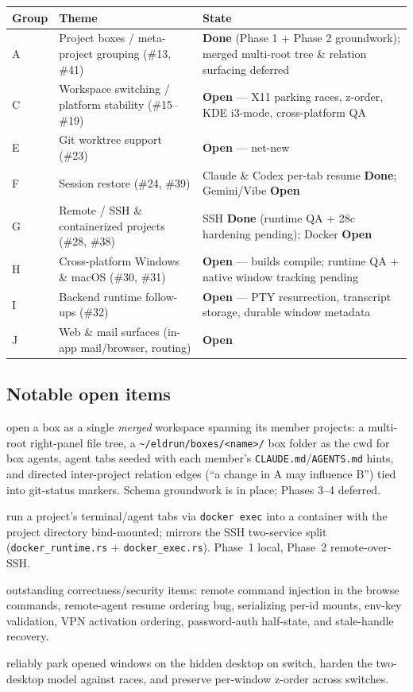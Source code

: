 \documentclass[11pt,a4paper]{article}
\newcommand{\done}{\textcolor{donegreen}{\textbf{Done}}}
\newcommand{\open}{\textcolor{openorange}{\textbf{Open}}}
\newcommand{\code}[1]{\texttt{#1}}
\begin{document}
\begin{longtable}{@{}p{1.6cm}p{7.2cm}p{5.4cm}@{}}
\toprule
\textbf{Group} & \textbf{Theme} & \textbf{State} \\
\midrule
\endhead
A  & Project boxes / meta-project grouping (\#13, \#41) & \done{} (Phase 1 + Phase 2 groundwork); merged multi-root tree \& relation surfacing deferred \\
C  & Workspace switching / platform stability (\#15--\#19) & \open{} --- X11 parking races, z-order, KDE i3-mode, cross-platform QA \\
E  & Git worktree support (\#23) & \open{} --- net-new \\
F  & Session restore (\#24, \#39) & Claude \& Codex per-tab resume \done{}; Gemini/Vibe \open{} \\
G  & Remote / SSH \& containerized projects (\#28, \#38) & SSH \done{} (runtime QA + 28c hardening pending); Docker \open{} \\
H  & Cross-platform Windows \& macOS (\#30, \#31) & \open{} --- builds compile; runtime QA + native window tracking pending \\
I  & Backend runtime follow-ups (\#32) & \open{} --- PTY resurrection, transcript storage, durable window metadata \\
J  & Web \& mail surfaces (in-app mail/browser, routing) & \open{} \\
\bottomrule
\end{longtable}

\subsection{Notable open items}

\begin{description}[leftmargin=1.2em,style=nextline]
  \item[Project box containers (\#41)] open a box as a single \emph{merged}
  workspace spanning its member projects: a multi-root right-panel file tree, a
  \code{\textasciitilde/eldrun/boxes/<name>/} box folder as the cwd for box
  agents, agent tabs seeded with each member's \code{CLAUDE.md}/\code{AGENTS.md}
  hints, and directed inter-project relation edges (``a change in A may
  influence B'') tied into git-status markers. Schema groundwork is in place;
  Phases 3--4 deferred.
  \item[Docker/Podman projects (\#38)] run a project's terminal/agent tabs via
  \code{docker exec} into a container with the project directory bind-mounted;
  mirrors the SSH two-service split (\code{docker\_runtime.rs} +
  \code{docker\_exec.rs}). Phase~1 local, Phase~2 remote-over-SSH.
  \item[SSH hardening (\#28c)] outstanding correctness/security items: remote
  command injection in the browse commands, remote-agent resume ordering bug,
  serializing per-id mounts, env-key validation, VPN activation ordering,
  password-auth half-state, and stale-handle recovery.
  \item[X11 robustness (\#15--\#17)] reliably park opened windows on the hidden
  desktop on switch, harden the two-desktop model against races, and preserve
  per-window z-order across switches.
\end{description}
\end{document}
